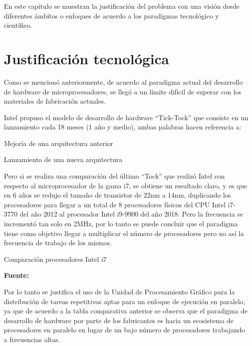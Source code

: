\documentclass[../main/main.tex]{subfiles}
\begin{document}
\espacio

  En este capítulo se muestran la justificación del problema con una visión desde diferentes ámbitos o enfoques de acuerdo a los paradigmas tecnológico y científico.

  \section{Justificación tecnológica}

  Como se mencionó anteriormente, de acuerdo al paradigma actual del desarrollo de hardware de microprocesadores, se llegó a un límite difícil de superar con los materiales de fabricación actuales.

  Intel propuso el modelo de desarrollo de hardware ``Tick-Tock'' que consiste en un lanzamiento cada 18 meses (1 año y medio), ambas palabras hacen referencia a:

  \begin{description}
    \item[Tick:] Mejoría de una arquitectura anterior
    \item[Tock:] Lanzamiento de una nueva arquitectura
  \end{description}

  Pero si se realiza una comparación del último ``Tock'' que realizó Intel con respecto al microprocesador de la gama i7, se obtiene un resultado claro, y es que en 6 años se redujo el tamaño de transistor de 22nm a 14nm, duplicando los procesadores para llegar a un total de 8 procesadores físicos del CPU Intel i7-3770 del año 2012 al procesador Intel i9-9900 del año 2018. Pero la frecuencia se incrementó tan solo en 2MHz, por lo tanto se puede concluir que el paradigma tiene como objetivo llegar a multiplicar el número de procesadores pero no así la frecuencia de trabajo de los mismos.

  \begin{table}[H]
    \centering
    \caption{Comparación procesadores Intel i7}
    
    \caption*{\textbf{Fuente:} \href{https://cpu.userbenchmark.com/Compare/Intel-Core-i9-9900K-vs-Intel-Core-i7-3770/4028vs1979}{\cite{web:i9_vs_i7}}}
  \end{table}

  Por lo tanto se justifica el uso de la Unidad de Procesamiento Gráfico para la distribución de tareas repetitivas aptas para un enfoque de ejecución en paralelo, ya que de acuerdo a la tabla comparativa anterior se observa que el paradigma de desarrollo de hardware por parte de los fabricantes es hacia un ecosistema de procesadores en paralelo en lugar de un bajo número de procesadores trabajando a frecuencias altas.
\end{document}
